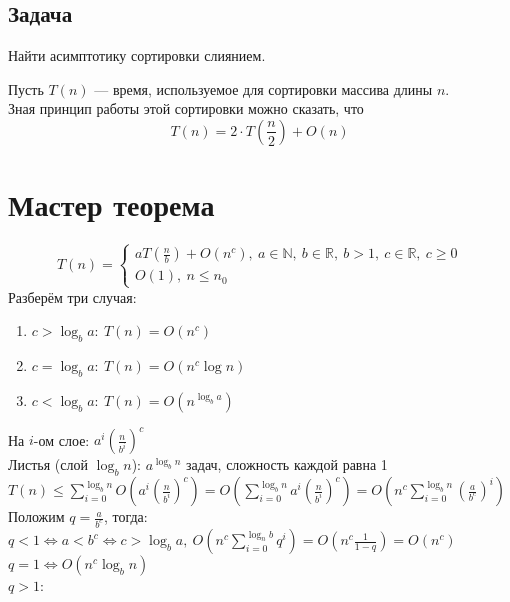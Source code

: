 \documentclass[12pt, a4paper]{article}
\begin{document}
    \subsection*{Задача}
    Найти асимптотику сортировки слиянием.\par
    Пусть $T(n)$ --- время, используемое для сортировки массива длины $n$.\\
    Зная принцип работы этой сортировки можно сказать, что
    \[T(n) = 2\cdot T\left(\frac{n}{2}\right) + O(n)\]
    \section{Мастер теорема}\label{sec:MasterTh}
    \[T(n) = \begin{cases}
        aT\left(\frac{n}{b}\right) + O(n^c),\ a\in \mathbb{N},\ b\in \mathbb{R},\ b>1,\ c\in \mathbb{R},\ c\geq 0\\
        O(1),\ n\leq n_0
    \end{cases}\]
    Разберём три случая:
    \begin{enumerate}
        \item $c > \log_b a:\ T(n) = O(n^c)$
        \item $c = \log_b a:\ T(n) = O(n^c\log n)$
        \item $c < \log_b a:\ T(n) = O(n^{\log_b a})$
    \end{enumerate}
    На $i$-ом слое: $a^i\left(\frac{n}{b^i}\right)^c$\\
    Листья (слой $\log_b n$): $a^{\log_b n}$ задач, сложность каждой равна 1\\
    $T(n) \leq \displaystyle \sum_{i = 0}^{\log_b n} O \left(a^i\left( \frac{n}{b^i} \right)^c\right) = O\left( \sum_{i = 0}^{\log_b n} a^i \left( \frac{n}{b^i} \right)^c \right) = O\left( n^c \sum_{i = 0}^{\log_b n} \left( \frac{a}{b^c}  \right)^i \right)$\\
    Положим $q = \frac{a}{b^c}$, тогда:\\
    $q < 1\Leftrightarrow a < b^c\Leftrightarrow c > \log_b a,\ \displaystyle O\left(n^c \sum_{i = 0}^{\log_n b} q^i\right) = O\left(n^c \frac{1}{1 - q}\right) = O\left(n^c\right)$\\
    $q = 1\Leftrightarrow O(n^c \log_b n)$\\
    $q > 1$:\\
\end{document}
